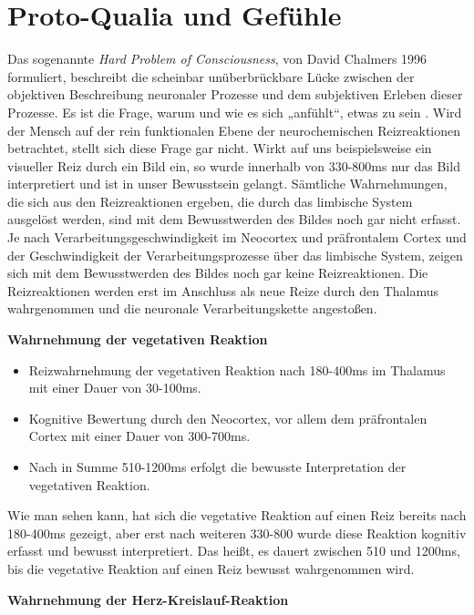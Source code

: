 \section*{Proto-Qualia und Gefühle}
Das sogenannte \emph{Hard Problem of Consciousness}, von David Chalmers 1996 formuliert, beschreibt die scheinbar unüberbrückbare Lücke zwischen der objektiven Beschreibung neuronaler Prozesse und dem subjektiven Erleben dieser Prozesse. Es ist die Frage, warum und wie es sich „anfühlt“, etwas zu sein \cite{Chalmers1996}. Wird der Mensch auf der rein funktionalen Ebene der neurochemischen Reizreaktionen betrachtet, stellt sich diese Frage gar nicht. Wirkt auf uns beispielsweise ein visueller Reiz durch ein Bild ein, so wurde innerhalb von 330-800ms nur das Bild interpretiert und ist in unser Bewusstsein gelangt. Sämtliche Wahrnehmungen, die sich aus den Reizreaktionen ergeben, die durch das limbische System ausgelöst werden, sind mit dem Bewusstwerden des Bildes noch gar nicht erfasst. Je nach Verarbeitungsgeschwindigkeit im Neocortex und präfrontalem Cortex und der Geschwindigkeit der Verarbeitungsprozesse über das limbische System, zeigen sich mit dem Bewusstwerden des Bildes noch gar keine Reizreaktionen. Die Reizreaktionen werden erst im Anschluss als neue Reize durch den Thalamus wahrgenommen und die neuronale Verarbeitungskette angestoßen.

\textbf{Wahrnehmung der vegetativen Reaktion}

\begin{itemize}
  \item Reizwahrnehmung der vegetativen Reaktion nach 180-400ms im Thalamus mit einer Dauer von 30-100ms.
  \item Kognitive Bewertung durch den Neocortex, vor allem dem präfrontalen Cortex mit einer Dauer von 300-700ms.
  \item Nach in Summe 510-1200ms erfolgt die bewusste Interpretation der vegetativen Reaktion.
\end{itemize}
Wie man sehen kann, hat sich die vegetative Reaktion auf einen Reiz bereits nach 180-400ms gezeigt, aber erst nach weiteren 330-800 wurde diese Reaktion kognitiv erfasst und bewusst interpretiert. Das heißt, es dauert zwischen 510 und 1200ms, bis die vegetative Reaktion auf einen Reiz bewusst wahrgenommen wird.

\textbf{Wahrnehmung der Herz-Kreislauf-Reaktion}

